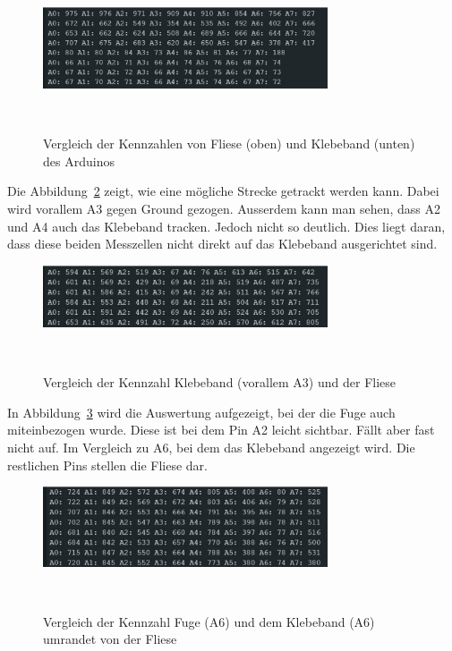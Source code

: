 \documentclass[main.tex]{subfiles} %
\begin{document}
\begin{figure}[h!]
    \centering
    \includegraphics[width=0.75\textwidth]{./fig_Liniensensor/Auswertung_Klebeband_zu_Fuge}
    \caption{Vergleich der Kennzahlen von Fliese (oben) und Klebeband (unten) des Arduinos}~\label{fig:Auswertung_Klebeband_zu_Fuge}
\end{figure}

Die Abbildung~\ref{fig:Auswertung_Strecke} zeigt, wie eine mögliche Strecke getrackt werden kann. Dabei wird vorallem A3 gegen Ground gezogen.
Ausserdem kann man sehen, dass A2 und A4 auch das Klebeband tracken. Jedoch nicht so deutlich. Dies liegt daran, dass diese beiden Messzellen nicht
direkt auf das Klebeband ausgerichtet sind.

\begin{figure}[h!]
    \centering
    \includegraphics[width=0.75\textwidth]{./fig_Liniensensor/Auswertung_Strecke}
    \caption{Vergleich der Kennzahl Klebeband (vorallem A3) und der Fliese}~\label{fig:Auswertung_Strecke}
\end{figure}

In Abbildung~\ref{fig:Auswertung_mit_Fuge} wird die Auswertung aufgezeigt, bei der die Fuge auch miteinbezogen wurde. Diese ist bei dem Pin A2 leicht
sichtbar. Fällt aber fast nicht auf. Im Vergleich zu A6, bei dem das Klebeband angezeigt wird. Die restlichen Pins stellen die Fliese dar.

\begin{figure}[h!]
    \centering
    \includegraphics[width=0.75\textwidth]{./fig_Liniensensor/Auswertung_mit_Fuge}
    \caption{Vergleich der Kennzahl Fuge (A6) und dem Klebeband (A6) umrandet von der Fliese}~\label{fig:Auswertung_mit_Fuge}
\end{figure}

\end{document}
